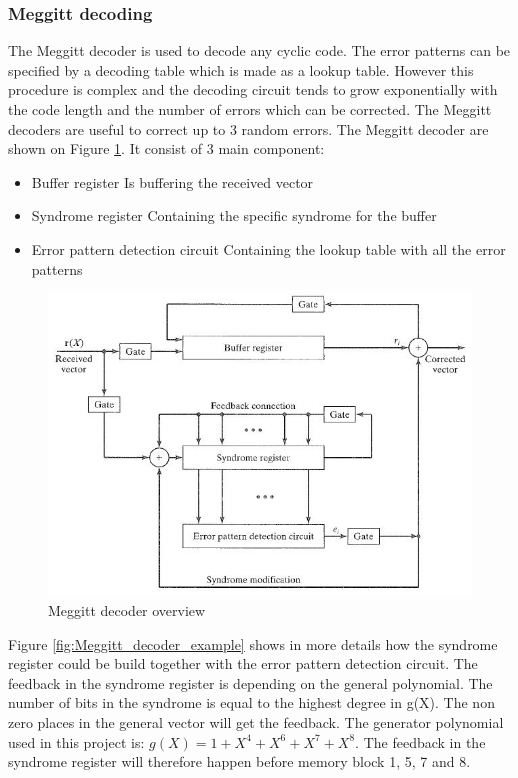 \documentclass[Main]{subfiles}
\begin{document}
\subsubsection{Meggitt decoding} 
The Meggitt decoder is used to decode any cyclic code.
The error patterns can be specified by a decoding table which is made as a lookup table.
However this procedure is complex and the decoding circuit tends to grow exponentially with the code length and the number of errors which can be corrected.
The Meggitt decoders are useful to correct up to 3 random errors.
The Meggitt decoder are shown on Figure \ref{fig:Meggitt_decoder}. It consist of 3 main component:
\begin{itemize}
\item Buffer register
\subitem Is buffering the received vector
\item Syndrome register
\subitem Containing the specific syndrome for the buffer
\item Error pattern detection circuit
\subitem Containing the lookup table with all the error patterns
\end{itemize}

\begin{figure}[H]
\centering
\includegraphics[width=0.7\linewidth]{./Picture/Meggitt_decoder}
\caption[The Meggitt decoder]{Meggitt decoder overview}
\label{fig:Meggitt_decoder}
\end{figure}

\noindent Figure \ref{fig:Meggitt_decoder_example} shows in more details how the syndrome register could be build together with the error pattern detection circuit.
The feedback in the syndrome register is depending on the general polynomial.
The number of bits in the syndrome is equal to the highest degree in g(X).
The non zero places in the general vector will get the feedback.
The generator polynomial used in this project is: $g(X)=1+X^4+X^6+X^7+X^8$.
The feedback in the syndrome register will therefore happen before memory block 1, 5, 7 and 8. 
\end{document}
